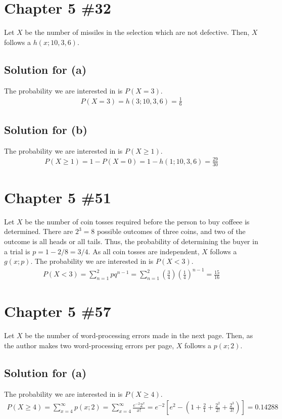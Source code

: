 \documentclass{scrartcl}
\begin{document}
\section{Chapter 5 \#32}
Let \(X\) be the number of missiles in the selection which are not defective.
Then, \(X\) follows a \(h(x; 10, 3, 6)\).

\subsection{Solution for (a)}
The probability we are interested in is \(P(X = 3)\).
\begin{align*}
  P(X = 3)
  = h(3; 10, 3, 6)
  = \frac{1}{6}
\end{align*}

\subsection{Solution for (b)}
The probability we are interested in is \(P(X \ge 1)\).
\begin{align*}
  P(X \ge 1)
  = 1 - P(X = 0)
  = 1 - h(1; 10, 3, 6)
  = \frac{29}{30}
\end{align*}

\section{Chapter 5 \#51}
Let \(X\) be the number of coin tosses required before the person to buy
coffeee is determined. There are \(2^3 = 8\) possible outcomes of three coins,
and two of the outcome is all heads or all tails. Thus, the probability of
determining the buyer in a trial is \(p = 1 - 2/8 = 3/4\). As all coin tosses
are independent, \(X\) follows a \(g(x; p)\). The probability we are interested
in is \(P(X < 3)\).
\begin{align*}
  P(X < 3)
  = \sum^2_{n = 1} pq^{n - 1}
  = \sum^2_{n = 1} \left( \frac{3}{4} \right) \left( \frac{1}{4} \right)^{n - 1}
  = \frac{15}{16}
\end{align*}

\section{Chapter 5 \#57}
Let \(X\) be the number of word-processing errors made in the next page. Then,
as the author makes two word-processing errors per page, \(X\) follows a \(p(x;
2)\).

\subsection{Solution for (a)}
The probability we are interested in is \(P(X \ge 4)\).
\begin{align*}
  P(X \ge 4)
  = \sum^\infty_{x = 4} p(x; 2)
  = \sum^\infty_{x = 4} \frac{e^{-2} 2^x}{x!}
  = e^{-2} \left[ e^2 - \left( 1 + \frac{2}{1} + \frac{2^2}{2!}
    + \frac{2^3}{3!} \right) \right]
  = 0.14288
\end{align*}
\end{document}
